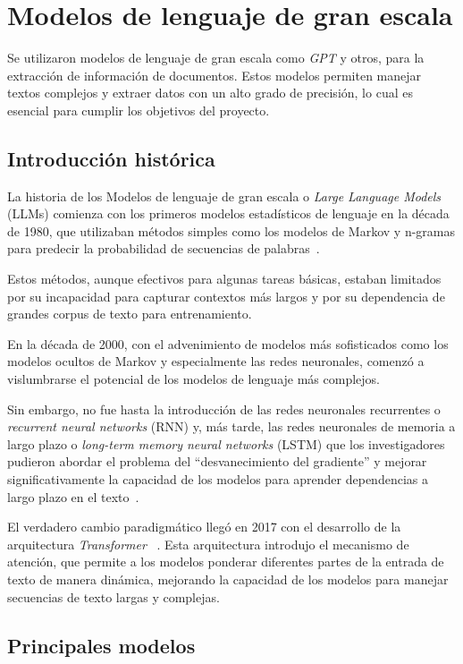 \section{Modelos de lenguaje de gran escala}

Se utilizaron modelos de lenguaje de gran escala como \textit{GPT} y otros, para la extracción de información de
documentos.
Estos modelos permiten manejar textos complejos y extraer datos con un alto grado de precisión, lo cual es esencial
para cumplir los objetivos del proyecto.

\subsection*{Introducción histórica}
La historia de los Modelos de lenguaje de gran escala o \textit{Large Language Models} (LLMs) comienza con los
primeros modelos estadísticos de lenguaje en la década de 1980, que utilizaban métodos simples como los modelos de
Markov y n-gramas para predecir la probabilidad de secuencias de palabras~\cite{article_jelinek_1997}.

Estos métodos, aunque efectivos para algunas tareas básicas, estaban limitados por su incapacidad para capturar
contextos más largos y por su dependencia de grandes corpus de texto para entrenamiento.

En la década de 2000, con el advenimiento de modelos más sofisticados como los modelos ocultos de Markov y especialmente
las redes neuronales, comenzó a vislumbrarse el potencial de los modelos de lenguaje más complejos.

Sin embargo, no fue hasta la introducción de las redes neuronales recurrentes o \textit{recurrent neural networks} (RNN)
y, más tarde, las redes neuronales de memoria a largo plazo o \textit{long-term memory neural networks} (LSTM) que
los investigadores pudieron abordar el problema del ``desvanecimiento del gradiente'' y mejorar significativamente la
capacidad de los modelos para aprender dependencias a largo plazo en el texto~\cite{article_hochreiter_1997}.

El verdadero cambio paradigmático llegó en 2017 con el desarrollo de la arquitectura \textit{Transformer}
~\cite{article_vaswani_2017}.
Esta arquitectura introdujo el mecanismo de atención, que permite a los modelos ponderar diferentes partes de la entrada
de texto de manera dinámica, mejorando la capacidad de los modelos para manejar secuencias de texto largas y complejas.

\subsection*{Principales modelos}


